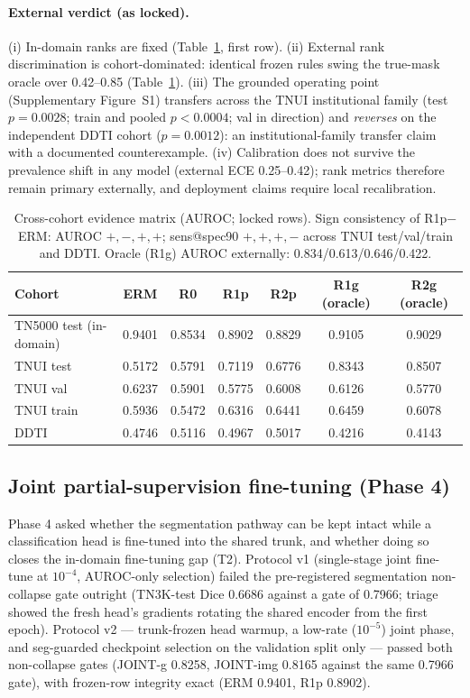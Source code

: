 \documentclass[jimh,article,submit,moreauthors,pdftex]{Definitions/tsp}
\begin{document}
\paragraph{External verdict (as locked).}
(i) In-domain ranks are fixed (Table~\ref{tab:evidence}, first row). (ii)
External rank discrimination is cohort-dominated: identical frozen
rules swing the true-mask oracle over 0.42--0.85
(Table~\ref{tab:evidence}). (iii) The grounded operating point
(Supplementary Figure~S1) transfers across the TNUI institutional
family (test $p{=}0.0028$; train and pooled $p{<}0.0004$; val in
direction) and \emph{reverses} on the independent DDTI cohort
($p{=}0.0012$): an institutional-family transfer claim with a
documented counterexample. (iv) Calibration does not survive the
prevalence shift in any model (external ECE 0.25--0.42); rank metrics
therefore remain primary externally, and deployment claims require
local recalibration.

\begin{table}[!ht]
\centering\small
\caption{Cross-cohort evidence matrix (AUROC; locked rows). Sign consistency of
R1p$-$ERM: AUROC $+,-,+,+$; sens@spec90 $+,+,+,-$ across TNUI test/val/train
and DDTI. Oracle (R1g) AUROC externally: 0.834/0.613/0.646/0.422.}
\label{tab:evidence}
\begin{tabular}{lcccccc}
\toprule
Cohort & ERM & R0 & R1p & R2p & R1g (oracle) & R2g (oracle) \\
\midrule
TN5000 test (in-domain) & 0.9401 & 0.8534 & 0.8902 & 0.8829 & 0.9105 & 0.9029 \\
TNUI test   & 0.5172 & 0.5791 & 0.7119 & 0.6776 & 0.8343 & 0.8507 \\
TNUI val    & 0.6237 & 0.5901 & 0.5775 & 0.6008 & 0.6126 & 0.5770 \\
TNUI train  & 0.5936 & 0.5472 & 0.6316 & 0.6441 & 0.6459 & 0.6078 \\
DDTI        & 0.4746 & 0.5116 & 0.4967 & 0.5017 & 0.4216 & 0.4143 \\
\bottomrule
\end{tabular}
\end{table}

\subsection{Joint partial-supervision fine-tuning (Phase 4)}
\label{subsec:res_phase4}

Phase 4 asked whether the segmentation pathway can be kept intact while
a classification head is fine-tuned into the shared trunk, and whether
doing so closes the in-domain fine-tuning gap (T2). Protocol v1
(single-stage joint fine-tune at $10^{-4}$, AUROC-only selection)
failed the pre-registered segmentation non-collapse gate outright
(TN3K-test Dice 0.6686 against a gate of 0.7966; triage showed the
fresh head's gradients rotating the shared encoder from the first
epoch). Protocol v2 --- trunk-frozen head warmup, a low-rate
($10^{-5}$) joint phase, and seg-guarded checkpoint selection on the
validation split only --- passed both non-collapse gates (JOINT-g
0.8258, JOINT-img 0.8165 against the same 0.7966 gate), with frozen-row
integrity exact (ERM 0.9401, R1p 0.8902).
\end{document}
